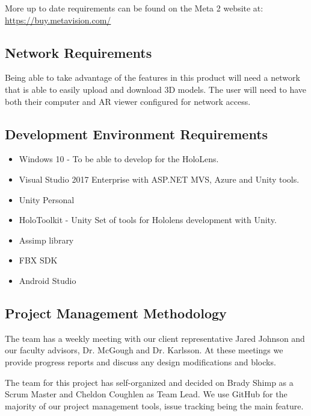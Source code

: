 More up to date requirements can be found on the Meta 2 website at: 
\url{https://buy.metavision.com/}

\subsection{Network Requirements}

Being able to take advantage of the features in this product will need a network
that is able to easily upload and download 3D models. The user will need to have
both their computer and AR viewer configured for network access.

\subsection{Development Environment Requirements}
\begin{itemize}
	\item Windows 10 - To be able to develop for the HoloLens.
	\item Visual Studio 2017 Enterprise with ASP.NET MVS, Azure and Unity tools.
	\item Unity Personal
	\item HoloToolkit - Unity Set of tools for Hololens development with Unity.
	\item Assimp library
	\item FBX SDK
	\item Android Studio
\end{itemize}


\subsection{Project Management Methodology}
The team has a weekly meeting with our client representative Jared Johnson and 
our faculty advisors, Dr. McGough and Dr. Karlsson. At these meetings we provide
progress reports and discuss any design modifications and blocks.

The team for this project has self-organized and decided on Brady Shimp as a
Scrum Master and Cheldon Coughlen as Team Lead. We use GitHub for the majority 
of our project management tools, issue tracking being the main feature.

